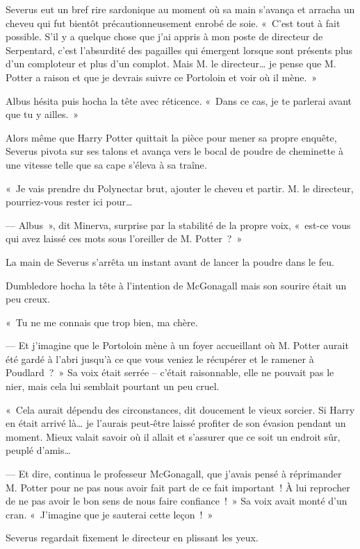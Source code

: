 Severus eut un bref rire sardonique au moment où sa main s'avança et arracha un cheveu qui fut bientôt précautionneusement enrobé de soie. «~C'est tout à fait possible. S'il y a quelque chose que j'ai appris à mon poste de directeur de Serpentard, c'est l'absurdité des pagailles qui émergent lorsque sont présents plus d'un comploteur et plus d'un complot. Mais M. le directeur… je pense que M. Potter a raison et que je devrais suivre ce Portoloin et voir où il mène.~»

Albus hésita puis hocha la tête avec réticence. «~Dans ce cas, je te parlerai avant que tu y ailles.~»

\later

Alors même que Harry Potter quittait la pièce pour mener sa propre enquête, Severus pivota sur ses talons et avança vers le bocal de poudre de cheminette à une vitesse telle que sa cape s'éleva à sa traîne.

«~Je vais prendre du Polynectar brut, ajouter le cheveu et partir. M. le directeur, pourriez-vous rester ici pour…

--- Albus~», dit Minerva, surprise par la stabilité de la propre voix, «~est-ce vous qui avez laissé ces mots sous l'oreiller de M. Potter~?~»

La main de Severus s'arrêta un instant avant de lancer la poudre dans le feu.

Dumbledore hocha la tête à l'intention de McGonagall mais son sourire était un peu creux.

«~Tu ne me connais que trop bien, ma chère.

--- Et j'imagine que le Portoloin mène à un foyer accueillant où M. Potter aurait été gardé à l'abri jusqu'à ce que vous veniez le récupérer et le ramener à Poudlard~?~» Sa voix était serrée -- c'était raisonnable, elle ne pouvait pas le nier, mais cela lui semblait pourtant un peu cruel.

«~Cela aurait dépendu des circonstances, dit doucement le vieux sorcier. Si Harry en était arrivé là… je l'aurais peut-être laissé profiter de son évasion pendant un moment. Mieux valait savoir où il allait et s'assurer que ce soit un endroit sûr, peuplé d'amis…

--- Et dire, continua le professeur McGonagall, que j'avais pensé à réprimander M. Potter pour ne pas nous avoir fait part de ce fait important~! À lui reprocher de ne pas avoir le bon sens de nous faire confiance~!~» Sa voix avait monté d'un cran. «~J'imagine que je sauterai cette leçon~!~»

Severus regardait fixement le directeur en plissant les yeux.


